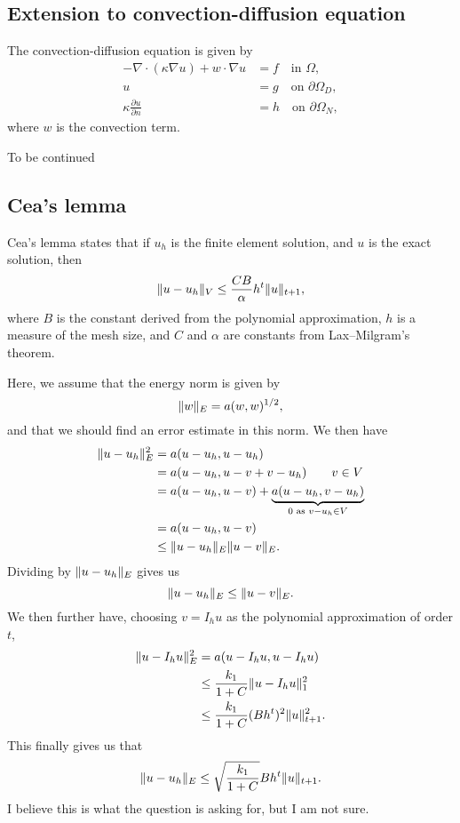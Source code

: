 \subsection{Extension to convection-diffusion equation}
The convection-diffusion equation is given by
\begin{equation}
    \begin{split}
        -\nabla \cdot (\kappa \nabla u) + w \cdot \nabla u &= f \quad \text{in } \Omega, \\
        u &= g \quad \text{on } \partial\Omega_D, \\
        \kappa \frac{\partial u}{\partial n} &= h \quad \text{on } \partial\Omega_N,
    \end{split}
\end{equation}
where $w$ is the convection term.

{\Large To be continued}

\subsection{Cea's lemma}
Cea's lemma states that if $u_h$ is the finite element solution, and $u$ is the exact solution, then
\begin{equation}
    \lVert u - u_h\rVert_V \leq \frac{C B}{\alpha} h^t \lVert u\rVert_{t + 1},
\end{equation}
where $B$ is the constant derived from the polynomial approximation, $h$ is a measure of the mesh size, and $C$ and $\alpha$ are constants from Lax--Milgram's theorem. %

Here, we assume that the energy norm is given by
\begin{equation}
    \lVert w\rVert_E = a(w, w)^{1/2},
\end{equation}
and that we should find an error estimate in this norm.
We then have
\begin{align*}
    \lVert u - u_h\rVert_E^2 &= a(u - u_h, u - u_h) \\
    &= a(u - u_h, u - v + v - u_h) \qquad v \in V \\
    &= a(u - u_h, u - v) + \underbrace{a(u - u_h, v - u_h)}_{0 \text{ as } v - u_h \in V} \\
    &= a(u - u_h, u - v) \\
    &\leq \lVert u - u_h\rVert_E \lVert u - v\rVert_E.
\end{align*}
Dividing by $\lVert u - u_h\rVert_E$ gives us
\begin{equation}
    \lVert u - u_h\rVert_E \leq \lVert u - v\rVert_E.
\end{equation}
We then further have, choosing $v = I_h u$ as the polynomial approximation of order $t$,
\begin{align*}
    \lVert u - I_h u\rVert_E^2 &= a(u - I_h u, u - I_h u) \\
    &\leq \frac{k_1}{1 + C} \lVert u - I_h u\rVert_1^2 \\
    &\leq \frac{k_1}{1 + C} (B h^t)^2 \lVert u\rVert_{t + 1}^2.
\end{align*}
This finally gives us that
\begin{equation}
    \lVert u - u_h\rVert_E \leq \sqrt{\frac{k_1}{1 + C}} B h^t \lVert u\rVert_{t + 1}.
\end{equation}
I believe this is what the question is asking for, but I am not sure.

